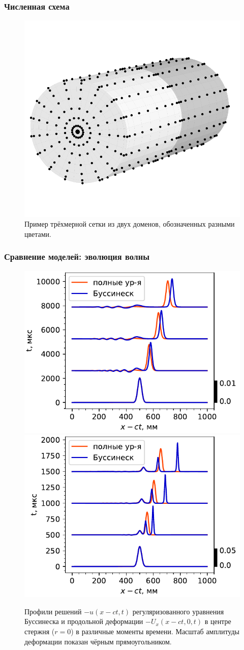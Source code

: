 \documentclass{beamer}
\begin{document}
\begin{frame} \frametitle{Численная схема}
\begin{figure}[h!]
	\centering
	\centering
	\includegraphics[width=.35\textwidth]{figures/Grid3D}
	\caption{Пример трёхмерной сетки из двух доменов, обозначенных разными цветами.}
\end{figure}
\end{frame}


\begin{frame} \frametitle{Сравнение моделей: эволюция волны}
\begin{figure}[h]
	\centering
	\includegraphics[width=0.49\linewidth]{figures/SolEvolCompareSmallColor}
	\includegraphics[width=0.49\linewidth]{figures/SolEvolCompareSmallColor2}
	\caption{Профили решений $-u(x-ct, t)$ регуляризованного уравнения Буссинеска и продольной деформации $-U_x(x - ct, 0, t)$ в центре стержня ($r=0$) в различные моменты времени. Масштаб амплитуды деформации показан чёрным прямоугольником.}
\end{figure}
\end{frame}
\end{document}
